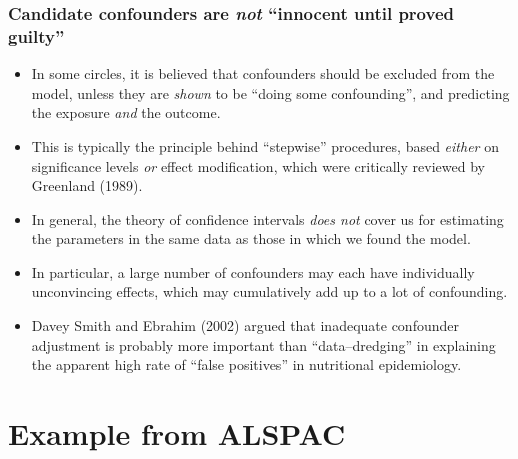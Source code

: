 \documentclass[11pt]{beamer}
\begin{document}
\begin{frame}
\frametitle{Candidate confounders are \textit{not} ``innocent until proved guilty''}

\begin{itemize}

\item<2-> In some circles, it is believed that confounders should be excluded from the model,
unless they are \textit{shown} to be ``doing some confounding'',
and predicting the exposure \textit{and} the outcome.

\item<3-> This is typically the principle behind ``stepwise'' procedures,
based \textit{either} on significance levels \textit{or} effect modification,
which were critically reviewed by Greenland (1989)\cite{greenland1989}.

\item<4-> In general, the theory of confidence intervals \textit{does not} cover us
for estimating the parameters in the same data as those in which we found the model.

\item<5-> In particular, a large number of confounders may each have individually unconvincing effects,
which may cumulatively add up to a lot of confounding.

\item<6-> Davey Smith and Ebrahim (2002)\cite{daveysmith2002} argued that inadequate confounder adjustment is probably
more important than ``data--dredging'' in explaining the apparent high rate of ``false positives'' in nutritional epidemiology.

\end{itemize}

\end{frame}

\section{Example from ALSPAC}
\end{document}
